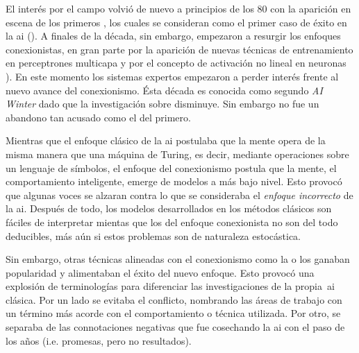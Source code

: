 
El interés por el campo volvió de nuevo a principios de los $80$ con la aparición en escena de los primeros , los cuales se consideran como el primer caso de éxito en la \gls{ai} (\cite{russell2003artificial}). A finales de la década, sin embargo, empezaron a resurgir los enfoques conexionistas, en gran parte por la aparición de nuevas técnicas de entrenamiento en perceptrones multicapa y por el concepto de activación no lineal en neuronas \cite{rumelhart1985learning, cybenko1989approximation}). En este momento los sistemas expertos empezaron a perder interés frente al nuevo avance del conexionismo. Ésta década es conocida como segundo \textit{AI Winter} dado que la investigación sobre  disminuye. Sin embargo no fue un abandono tan acusado como el del primero.

Mientras que el enfoque clásico de la \gls{ai} postulaba que la mente opera de la misma manera que una máquina de Turing, es decir, mediante operaciones sobre un lenguaje de símbolos, el enfoque del conexionismo postula que la mente, el comportamiento inteligente, emerge de modelos a más bajo nivel. Esto provocó que algunas voces se alzaran contra lo que se consideraba el \textit{enfoque incorrecto} de la \gls{ai}. Después de todo, los modelos desarrollados en los métodos clásicos son fáciles de interpretar mientas que los del enfoque conexionista no son del todo deducibles, más aún si estos problemas son de naturaleza estocástica.

Sin embargo, otras técnicas alineadas con el conexionismo como la  o los  ganaban popularidad y alimentaban el éxito del nuevo enfoque. Esto provocó una explosión de terminologías para diferenciar las investigaciones de la propia~\ac{ai} clásica. Por un lado se evitaba el conflicto, nombrando las áreas de trabajo con un término más acorde con el comportamiento o técnica utilizada. Por otro, se separaba de las connotaciones negativas que fue cosechando la \ac{ai} con el paso de los años (i.e. promesas, pero no resultados).

